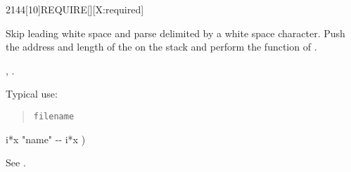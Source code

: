 \begin{worddef}{2144}[10]{REQUIRE}[][X:required]
\item {}

	Skip leading white space and parse  delimited by a
	white space character. Push the address and length of the
	 on the stack and perform the function of
	.

\see {},
	.

	\begin{rationale} %
		Typical use:
		\begin{quote}
			 \texttt{filename}
		\end{quote}
	\end{rationale}

	\begin{implement} %
		\word{:}   i*x "name" -{}- i*x ) \\
		\tab {}  \word{;}
	\end{implement}

	\begin{testing} %
		See .
	\end{testing}
\end{worddef}


